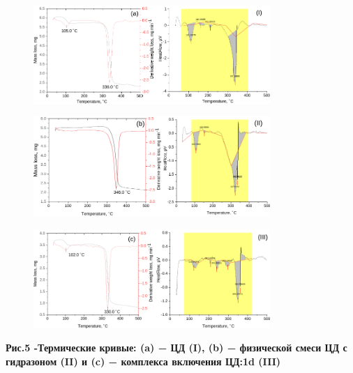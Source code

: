 \begin{figure}[H]
	\centering
	\includegraphics[width=0.8\textwidth]{media/chem2/image58}
	\caption*{}
\end{figure}



\begin{figure}[H]
	\centering
	\includegraphics[width=0.8\textwidth]{media/chem2/image59}
	\caption*{}
\end{figure}

\begin{figure}[H]
	\centering
	\includegraphics[width=0.8\textwidth]{media/chem2/image60}
	\caption*{}
\end{figure}


{\bfseries Рис.5 -Термические кривые: (a) − ЦД (I), (b) − физической смеси
ЦД с гидразоном (II) и (c) − комплекса включения ЦД:1d (III)}

